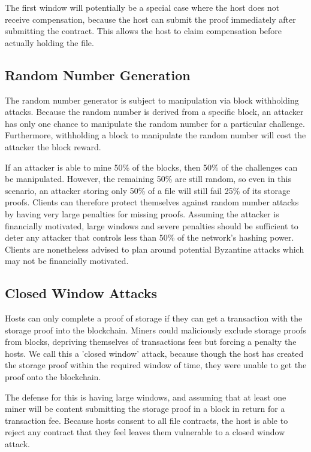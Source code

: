 \documentclass[twocolumn]{article}
\begin{document}
The first window will potentially be a special case where the host does not receive compensation, because the host can submit the proof immediately after submitting the contract.
This allows the host to claim compensation before actually holding the file.

\subsection{Random Number Generation}
The random number generator is subject to manipulation via block withholding attacks.
Because the random number is derived from a specific block, an attacker has only one chance to manipulate the random number for a particular challenge.
Furthermore, withholding a block to manipulate the random number will cost the attacker the block reward.

If an attacker is able to mine 50\% of the blocks, then 50\% of the challenges can be manipulated.
However, the remaining 50\% are still random, so even in this scenario, an attacker storing only 50\% of a file will still fail 25\% of its storage proofs.
Clients can therefore protect themselves against random number attacks by having very large penalties for missing proofs.
Assuming the attacker is financially motivated, large windows and severe penalties should be sufficient to deter any attacker that controls less than 50\% of the network's hashing power.
Clients are nonetheless advised to plan around potential Byzantine attacks which may not be financially motivated.

\subsection{Closed Window Attacks}
Hosts can only complete a proof of storage if they can get a transaction with the storage proof into the blockchain.
Miners could maliciously exclude storage proofs from blocks, depriving themselves of transactions fees but forcing a penalty the hosts.
We call this a 'closed window' attack, because though the host has created the storage proof within the required window of time, they were unable to get the proof onto the blockchain.

The defense for this is having large windows, and assuming that at least one miner will be content submitting the storage proof in a block in return for a transaction fee.
Because hosts consent to all file contracts, the host is able to reject any contract that they feel leaves them vulnerable to a closed window attack.
\end{document}
